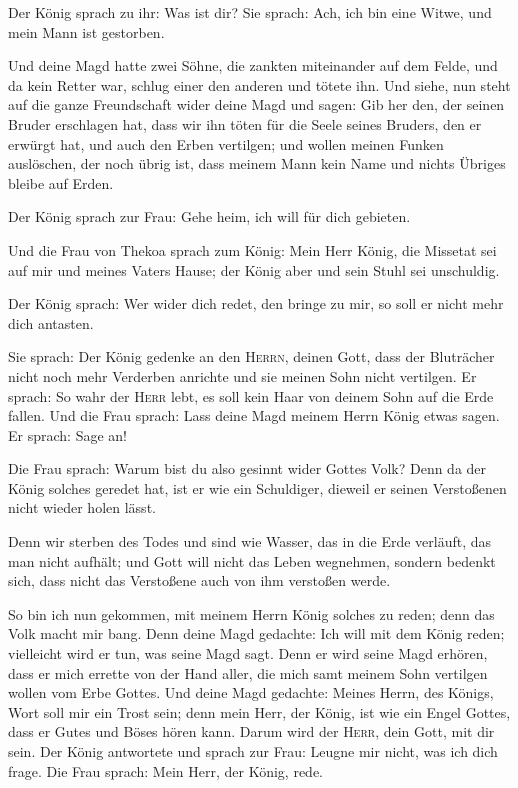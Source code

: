  Der König sprach zu ihr: Was ist dir? Sie sprach: Ach,
ich bin eine Witwe, und mein Mann ist gestorben.

 Und deine Magd hatte zwei Söhne, die zankten miteinander
auf dem Felde, und da kein Retter war, schlug einer den anderen und
tötete ihn.  Und siehe, nun steht auf die ganze
Freundschaft wider deine Magd und sagen: Gib her den, der seinen Bruder
erschlagen hat, dass wir ihn töten für die Seele seines Bruders, den er
erwürgt hat, und auch den Erben vertilgen; und wollen meinen Funken
auslöschen, der noch übrig ist, dass meinem Mann kein Name und nichts
Übriges bleibe auf Erden.

 Der König sprach zur Frau: Gehe heim, ich will für dich
gebieten.

 Und die Frau von Thekoa sprach zum König: Mein Herr
König, die Missetat sei auf mir und meines Vaters Hause; der König aber
und sein Stuhl sei unschuldig.

 Der König sprach: Wer wider dich redet, den bringe zu
mir, so soll er nicht mehr dich antasten.

 Sie sprach: Der König gedenke an den \textsc{Herrn},
deinen Gott, dass der Bluträcher nicht noch mehr Verderben anrichte und
sie meinen Sohn nicht vertilgen. Er sprach: So wahr der \textsc{Herr}
lebt, es soll kein Haar von deinem Sohn auf die Erde fallen.
 Und die Frau sprach: Lass deine Magd meinem Herrn König
etwas sagen. Er sprach: Sage an!

 Die Frau sprach: Warum bist du also gesinnt wider Gottes
Volk? Denn da der König solches geredet hat, ist er wie ein Schuldiger,
dieweil er seinen Verstoßenen nicht wieder holen lässt.

 Denn wir sterben des Todes und sind wie Wasser, das in
die Erde verläuft, das man nicht aufhält; und Gott will nicht das Leben
wegnehmen, sondern bedenkt sich, dass nicht das Verstoßene auch von ihm
verstoßen werde.

 So bin ich nun gekommen, mit meinem Herrn König solches
zu reden; denn das Volk macht mir bang. Denn deine Magd gedachte: Ich
will mit dem König reden; vielleicht wird er tun, was seine Magd sagt.
 Denn er wird seine Magd erhören, dass er mich errette
von der Hand aller, die mich samt meinem Sohn vertilgen wollen vom Erbe
Gottes.  Und deine Magd gedachte: Meines Herrn, des
Königs, Wort soll mir ein Trost sein; denn mein Herr, der König, ist wie
ein Engel Gottes, dass er Gutes und Böses hören kann. Darum wird der
\textsc{Herr}, dein Gott, mit dir sein.  Der König
antwortete und sprach zur Frau: Leugne mir nicht, was ich dich frage.
Die Frau sprach: Mein Herr, der König, rede.

